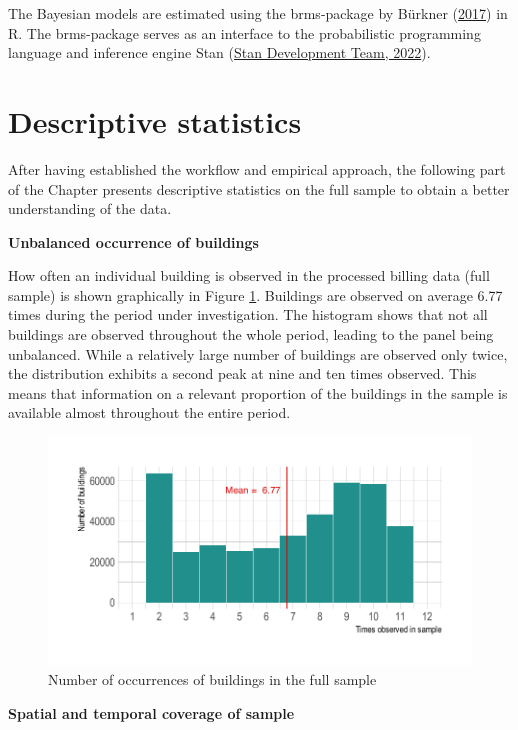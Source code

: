 \documentclass[12pt,twoside]{reedthesis}
\begin{document}
The Bayesian models are estimated using the brms-package by Bürkner (\protect\hyperlink{ref-burkner17}{2017}) in R. The brms-package serves as an interface to the probabilistic programming language and inference engine Stan (\protect\hyperlink{ref-standevelopmentteam22}{Stan Development Team, 2022}).

\hypertarget{descriptives}{%
\section{Descriptive statistics}\label{descriptives}}

After having established the workflow and empirical approach, the following part of the Chapter presents descriptive statistics on the full sample to obtain a better understanding of the data.

\textbf{Unbalanced occurrence of buildings}

How often an individual building is observed in the processed billing data (full sample) is shown graphically in Figure \ref{fig:occurrence-buildings}. Buildings are observed on average 6.77 times during the period under investigation. The histogram shows that not all buildings are observed throughout the whole period, leading to the panel being unbalanced. While a relatively large number of buildings are observed only twice, the distribution exhibits a second peak at nine and ten times observed. This means that information on a relevant proportion of the buildings in the sample is available almost throughout the entire period.
\begin{figure}

{\centering \includegraphics[width=0.75\linewidth]{figure/occurance_buildings} 

}

\caption{Number of occurrences of buildings in the full sample}\label{fig:occurrence-buildings}
\end{figure}
\textbf{Spatial and temporal coverage of sample}
\end{document}

